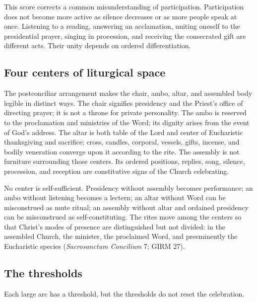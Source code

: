 This score corrects a common misunderstanding of participation. Participation does not become more active as silence decreases or as more people speak at once. Listening to a reading, answering an acclamation, uniting oneself to the presidential prayer, singing in procession, and receiving the consecrated gift are different acts. Their unity depends on ordered differentiation.

\subsection{Four centers of liturgical space}

The postconciliar arrangement makes the chair, ambo, altar, and assembled body legible in distinct ways. The chair signifies presidency and the Priest's office of directing prayer; it is not a throne for private personality. The ambo is reserved to the proclamation and ministries of the Word; its dignity arises from the event of God's address. The altar is both table of the Lord and center of Eucharistic thanksgiving and sacrifice; cross, candles, corporal, vessels, gifts, incense, and bodily veneration converge upon it according to the rite. The assembly is not furniture surrounding those centers. Its ordered positions, replies, song, silence, procession, and reception are constitutive signs of the Church celebrating.

No center is self-sufficient. Presidency without assembly becomes performance; an ambo without listening becomes a lectern; an altar without Word can be misconstrued as mute ritual; an assembly without altar and ordained presidency can be misconstrued as self-constituting. The rites move among the centers so that Christ's modes of presence are distinguished but not divided: in the assembled Church, the minister, the proclaimed Word, and preeminently the Eucharistic species (\emph{Sacrosanctum Concilium} 7; GIRM 27).

\subsection{The thresholds}

Each large arc has a threshold, but the thresholds do not reset the celebration.

